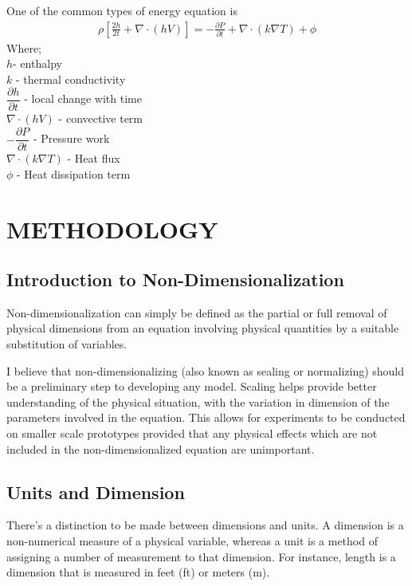 \documentclass[11pt]{report}
\newcommand{\NI}{\noindent}
\begin{document}
	\NI One of the common types of energy equation is
	\begin{eqnarray*}
		\rho\left[\frac{2h}{2t} + \nabla \cdot (hV)\right] = - \frac{\partial P}{\partial t} + \nabla \cdot (k\nabla T) + \phi
	\end{eqnarray*}
	Where;\\
	\hspace*{1cm} $h$- enthalpy\\
	\hspace*{1cm} $k$ - thermal conductivity\\
	\hspace*{1cm} $\dfrac{\partial h}{\partial t}$ - local change with time \\
	\hspace*{1cm} $\nabla \cdot (hV)$ - convective term\\
	\hspace*{1cm} $-\dfrac{\partial P}{\partial t}$ - Pressure work\\
	\hspace*{1cm} $\nabla \cdot (k\nabla T)$ - Heat flux\\
	\hspace*{1cm} $\phi$ - Heat dissipation term\\
	
	
	
	\chapter{METHODOLOGY}
	\section{Introduction to Non-Dimensionalization}
	Non-dimensionalization can simply be defined as the partial or full removal of physical dimensions from an equation involving physical quantities by a suitable substitution of variables.
	
	\NI I believe that non-dimensionalizing (also known as sealing or normalizing) should be a preliminary step to developing any model. Scaling helps provide better understanding of the physical situation, with the variation in dimension of the parameters involved in the equation. This allows for experiments to be conducted on smaller scale prototypes provided that any physical effects which are not included in the non-dimensionalized equation are unimportant.
	
	\section{Units and Dimension}
	There's a distinction to be made between dimensions and units. A dimension is a non-numerical measure of a physical variable, whereas a unit is a method of assigning a number of measurement to that dimension. For instance, length is a dimension that is measured in feet (ft) or meters (m).
	
\end{document}
